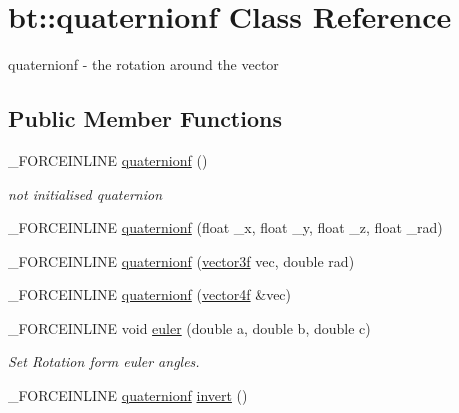 \hypertarget{classbt_1_1quaternionf}{\section{bt\-:\-:quaternionf Class Reference}
\label{classbt_1_1quaternionf}
}


quaternionf -\/ the rotation around the vector  


\subsection*{Public Member Functions}
\begin{DoxyCompactItemize}
\item 
\hypertarget{classbt_1_1quaternionf_a030371e1cd179dff9ff4562ec27bf48a}{\-\_\-\-F\-O\-R\-C\-E\-I\-N\-L\-I\-N\-E \hyperlink{classbt_1_1quaternionf_a030371e1cd179dff9ff4562ec27bf48a}{quaternionf} ()}\label{classbt_1_1quaternionf_a030371e1cd179dff9ff4562ec27bf48a}

\begin{DoxyCompactList}\small\item\em not initialised quaternion \end{DoxyCompactList}\item 
\-\_\-\-F\-O\-R\-C\-E\-I\-N\-L\-I\-N\-E \hyperlink{classbt_1_1quaternionf_aded4aead210703a80abfbc5f7af673da}{quaternionf} (float \-\_\-x, float \-\_\-y, float \-\_\-z, float \-\_\-rad)
\item 
\-\_\-\-F\-O\-R\-C\-E\-I\-N\-L\-I\-N\-E \hyperlink{classbt_1_1quaternionf_aadffb80b3736c0c55ab6355aab9f205b}{quaternionf} (\hyperlink{classbt_1_1vector3f}{vector3f} vec, double rad)
\item 
\-\_\-\-F\-O\-R\-C\-E\-I\-N\-L\-I\-N\-E \hyperlink{classbt_1_1quaternionf_a14c077f384c5c240c03f81bcf10661f2}{quaternionf} (\hyperlink{classbt_1_1vector4f}{vector4f} \&vec)
\item 
\hypertarget{classbt_1_1quaternionf_a220611f48937015e45766f3e6ec1b322}{\-\_\-\-F\-O\-R\-C\-E\-I\-N\-L\-I\-N\-E void \hyperlink{classbt_1_1quaternionf_a220611f48937015e45766f3e6ec1b322}{euler} (double a, double b, double c)}\label{classbt_1_1quaternionf_a220611f48937015e45766f3e6ec1b322}

\begin{DoxyCompactList}\small\item\em Set Rotation form euler angles. \end{DoxyCompactList}\item 
\hypertarget{classbt_1_1quaternionf_a3f55d007faafda5e227ddfe63f9a6ef9}{\-\_\-\-F\-O\-R\-C\-E\-I\-N\-L\-I\-N\-E \hyperlink{classbt_1_1quaternionf}{quaternionf} \hyperlink{classbt_1_1quaternionf_a3f55d007faafda5e227ddfe63f9a6ef9}{invert} ()}\label{classbt_1_1quaternionf_a3f55d007faafda5e227ddfe63f9a6ef9}


\end{DoxyCompactItemize}
